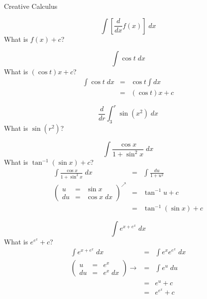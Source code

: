\documentclass{article}
\begin{document}
\begin{category}{Creative Calculus}

  \begin{clue}
    \[ \int \left[ \frac{d}{dx} f(x) \right] \; dx \]
  \response
    What is $f(x) + c$?
  \end{clue}

  \begin{clue}
    \[ \int \cos t \; dx \]
  \response
    What is $(\cos t)x + c$?
  \solution
    \[
    \begin{array}{rcl}
    {\displaystyle \int \cos t \; dx} & = & {\displaystyle \cos t \int  dx} \\
     & = & {\displaystyle (\cos t)x +   c }
    \end{array}
    \]
  \end{clue}

  \begin{clue}
    \[ \frac{d}{dr} \int_{3}^{r} \sin (x^{2}) \; dx \]
  \response
    What is $\sin (r^{2})$?
  \end{clue}

  \begin{clue}
    \[ \int \frac{\cos x}{1 + \sin^{2} x} \; dx \]
  \response
    What is $\tan^{-1} (\sin x) + c$?
  \solution
    \[
    \begin{array}{rcl}
    {\displaystyle \int \frac{\cos x}{1 + \sin^{2} x} \; dx} & = & {\displaystyle \int \frac{du}{1+u^{2}}} \\
    \left( \begin{array}{rcl}
    u & = & \sin x \\
    du & = & \cos x \; dx
    \end{array} \right)^{\nearrow} & = & {\displaystyle \tan^{-1} u + c} \\
     & = & {\displaystyle \tan^{-1} (\sin x) + c}
    \end{array}
    \]
  \end{clue}

  \begin{clue}
    \[ \int e^{x+e^{x}} \; dx \]
  \response
    What is $e^{e^{x}} + c$?
  \solution
    \[
    \begin{array}{rcl}
    {\displaystyle \int e^{x+e^{x}} \; dx} & = & {\displaystyle \int e^{x}e^{e^{x}} \; dx} \\
    \left( \begin{array}{rcl}
    u & = & e^{x} \\
    du & = & e^{x} \; dx
    \end{array} \right) \rightarrow & = & {\displaystyle \int e^{u} \; du} \\
     & = & {\displaystyle e^{u} + c} \\
     & = & {\displaystyle e^{e^{x}} + c }
    \end{array}
    \]
  \end{clue}

\end{category}
\end{document}
